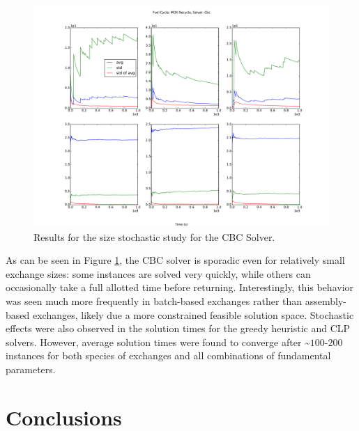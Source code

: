 \documentclass{anstrans}
\begin{document}
\begin{figure}
  \begin{center}
    \includegraphics[width=1.5\columnwidth]{1k_avg_front_time_fc1_solvercbc.pdf}
    \caption[]{
      \label{fig:cbc_stochastic}
      Results for the size stochastic study for the CBC Solver.
      }
  \end{center}
\end{figure}

As can be seen in Figure \ref{fig:cbc_stochastic}, the CBC solver is sporadic
even for relatively small exchange sizes: some instances are solved very
quickly, while others can occasionally take a full allotted time before
returning. Interestingly, this behavior was seen much more frequently in
batch-based exchanges rather than assembly-based exchanges, likely due a more
constrained feasible solution space. Stochastic effects were also observed in
the solution times for the greedy heuristic and CLP solvers. However, average
solution times were found to converge after \textasciitilde$100$-$200$ instances
for both species of exchanges and all combinations of fundamental parameters.


\section{Conclusions}
\end{document}
